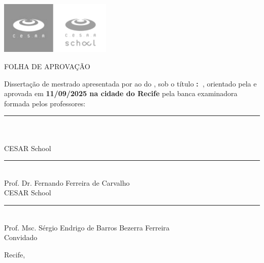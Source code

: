 \begin{titlepage}
\thispagestyle{empty}
\begin{center}
  \includegraphics[height=2.5cm]{imagens/capa/logos-cesar-pb.png}

  \vspace*{1cm}
  {\large\MakeUppercase{Folha de Aprovação}}

  \vspace*{3cm}

  \begin{minipage}{0.8\textwidth}
    \onehalfspacing
    \noindent
    Dissertação de mestrado apresentada por \textbf{\theauthor} ao {\programa} do {\cesar}, sob o título \textbf{\titulo:~\subtitulo}, orientado pela \textbf{\orientadora} e aprovada em \textbf{11/09/2025 na cidade do Recife} pela banca examinadora formada pelos professores:
  \end{minipage}

  \vspace{5\baselineskip}

  \rule{0.8\textwidth}{0.4pt}\\
  \orientadora\\
  CESAR School

  \vspace{2\baselineskip}
  \rule{0.8\textwidth}{0.4pt}\\
  Prof. Dr. Fernando Ferreira de Carvalho\\
  CESAR School

  \vspace{2\baselineskip}
  \rule{0.8\textwidth}{0.4pt}\\
  Prof. Msc. Sérgio Endrigo de Barros Bezerra Ferreira\\
  Convidado

  \vfill
  {\small Recife, \myear}
\end{center}
\end{titlepage}
\restoregeometry
